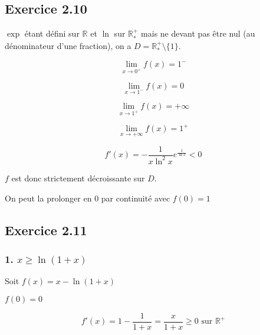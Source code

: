 \documentclass{report}
\begin{document}
\subsection*{Exercice 2.10}

$\exp$ étant défini sur $\mathbb{R}$ et $\ln$ sur $\mathbb{R}^{+}_{*}$ mais ne devant pas être nul (au dénominateur d'une
fraction), on a $D = \mathbb{R}^{+}_{*}\setminus\{1\}$.

\begin{displaymath}
	\lim_{x \rightarrow 0^{+}} f(x) = 1^{-}
\end{displaymath}

\begin{displaymath}
	\lim_{x \rightarrow 1^{-}} f(x) = 0
\end{displaymath}

\begin{displaymath}
	\lim_{x \rightarrow 1^{+}} f(x) = +\infty
\end{displaymath}

\begin{displaymath}
	\lim_{x \rightarrow +\infty} f(x) = 1^{+}
\end{displaymath}

\begin{displaymath}
	f'(x) =-\frac{1}{x\ln^2 x} e^{\frac{1}{\ln x}} < 0
\end{displaymath}

$f$ est donc strictement décroissante sur $D$.


On peut la prolonger en $0$ par continuité avec $f(0) = 1$



\subsection*{Exercice 2.11}
\subsubsection*{1. $x \geq \ln(1+x)$}

Soit $f(x) = x - \ln(1+x)$

$f(0) = 0$

\begin{displaymath}
	f'(x) = 1 - \frac{1}{1+x} = \frac{x}{1+x} \geq 0 \text{ sur } \mathbb{R}^{+}
\end{displaymath}
\end{document}
